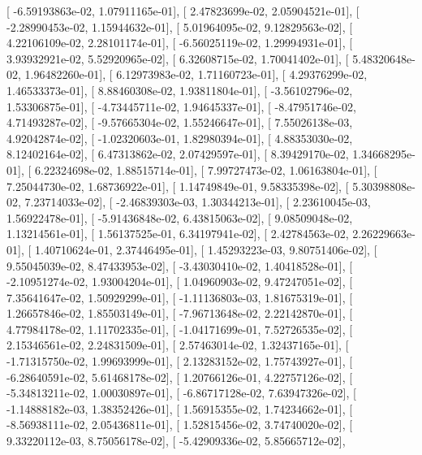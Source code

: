 \documentclass{article}
\begin{document}
       [ -6.59193863e-02,   1.07911165e-01],
       [  2.47823699e-02,   2.05904521e-01],
       [ -2.28990453e-02,   1.15944632e-01],
       [  5.01964095e-02,   9.12829563e-02],
       [  4.22106109e-02,   2.28101174e-01],
       [ -6.56025119e-02,   1.29994931e-01],
       [  3.93932921e-02,   5.52920965e-02],
       [  6.32608715e-02,   1.70041402e-01],
       [  5.48320648e-02,   1.96482260e-01],
       [  6.12973983e-02,   1.71160723e-01],
       [  4.29376299e-02,   1.46533373e-01],
       [  8.88460308e-02,   1.93811804e-01],
       [ -3.56102796e-02,   1.53306875e-01],
       [ -4.73445711e-02,   1.94645337e-01],
       [ -8.47951746e-02,   4.71493287e-02],
       [ -9.57665304e-02,   1.55246647e-01],
       [  7.55026138e-03,   4.92042874e-02],
       [ -1.02320603e-01,   1.82980394e-01],
       [  4.88353030e-02,   8.12402164e-02],
       [  6.47313862e-02,   2.07429597e-01],
       [  8.39429170e-02,   1.34668295e-01],
       [  6.22324698e-02,   1.88515714e-01],
       [  7.99727473e-02,   1.06163804e-01],
       [  7.25044730e-02,   1.68736922e-01],
       [  1.14749849e-01,   9.58335398e-02],
       [  5.30398808e-02,   7.23714033e-02],
       [ -2.46839303e-03,   1.30344213e-01],
       [  2.23610045e-03,   1.56922478e-01],
       [ -5.91436848e-02,   6.43815063e-02],
       [  9.08509048e-02,   1.13214561e-01],
       [  1.56137525e-01,   6.34197941e-02],
       [  2.42784563e-02,   2.26229663e-01],
       [  1.40710624e-01,   2.37446495e-01],
       [  1.45293223e-03,   9.80751406e-02],
       [  9.55045039e-02,   8.47433953e-02],
       [ -3.43030410e-02,   1.40418528e-01],
       [ -2.10951274e-02,   1.93004204e-01],
       [  1.04960903e-02,   9.47247051e-02],
       [  7.35641647e-02,   1.50929299e-01],
       [ -1.11136803e-03,   1.81675319e-01],
       [  1.26657846e-02,   1.85503149e-01],
       [ -7.96713648e-02,   2.22142870e-01],
       [  4.77984178e-02,   1.11702335e-01],
       [ -1.04171699e-01,   7.52726535e-02],
       [  2.15346561e-02,   2.24831509e-01],
       [  2.57463014e-02,   1.32437165e-01],
       [ -1.71315750e-02,   1.99693999e-01],
       [  2.13283152e-02,   1.75743927e-01],
       [ -6.28640591e-02,   5.61468178e-02],
       [  1.20766126e-01,   4.22757126e-02],
       [ -5.34813211e-02,   1.00030897e-01],
       [ -6.86717128e-02,   7.63947326e-02],
       [ -1.14888182e-03,   1.38352426e-01],
       [  1.56915355e-02,   1.74234662e-01],
       [ -8.56938111e-02,   2.05436811e-01],
       [  1.52815456e-02,   3.74740020e-02],
       [  9.33220112e-03,   8.75056178e-02],
       [ -5.42909336e-02,   5.85665712e-02],
\end{document}
